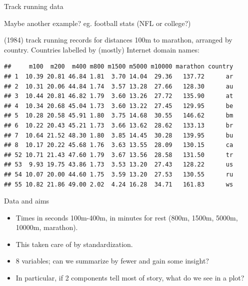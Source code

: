 \begin{frame}[fragile]{Track running data}

  Maybe another example? eg. football stats (NFL or college?)
  
(1984) track running records for distances 100m to marathon, arranged by country. Countries labelled by (mostly) Internet domain names:

{\footnotesize
\begin{knitrout}
\color{fgcolor}\begin{kframe}
\begin{alltt}
\hlkwb{=}\hlstd{(}\hlstd{,}
\hlstd{track[}\hlstd{(}\hlopt{:}\hlstd{,}\hlopt{:}\hlstd{),]}
\end{alltt}
\begin{verbatim}
##     m100  m200  m400 m800 m1500 m5000 m10000 marathon country
## 1  10.39 20.81 46.84 1.81  3.70 14.04  29.36   137.72      ar
## 2  10.31 20.06 44.84 1.74  3.57 13.28  27.66   128.30      au
## 3  10.44 20.81 46.82 1.79  3.60 13.26  27.72   135.90      at
## 4  10.34 20.68 45.04 1.73  3.60 13.22  27.45   129.95      be
## 5  10.28 20.58 45.91 1.80  3.75 14.68  30.55   146.62      bm
## 6  10.22 20.43 45.21 1.73  3.66 13.62  28.62   133.13      br
## 7  10.64 21.52 48.30 1.80  3.85 14.45  30.28   139.95      bu
## 8  10.17 20.22 45.68 1.76  3.63 13.55  28.09   130.15      ca
## 52 10.71 21.43 47.60 1.79  3.67 13.56  28.58   131.50      tr
## 53  9.93 19.75 43.86 1.73  3.53 13.20  27.43   128.22      us
## 54 10.07 20.00 44.60 1.75  3.59 13.20  27.53   130.55      ru
## 55 10.82 21.86 49.00 2.02  4.24 16.28  34.71   161.83      ws
\end{verbatim}
\end{kframe}
\end{knitrout}
}
  
\end{frame}

\begin{frame}[fragile]{Data and aims}

  \begin{itemize}
  \item 
Times in seconds 100m-400m, in minutes for rest (800m, 1500m, 5000m, 10000m, marathon).
\item This taken care of by standardization.
\item 8 variables; can we summarize by fewer and gain some insight?
\item In particular, if 2 components tell most of story, what do we see in a plot?

  \end{itemize}

  
\end{frame}


